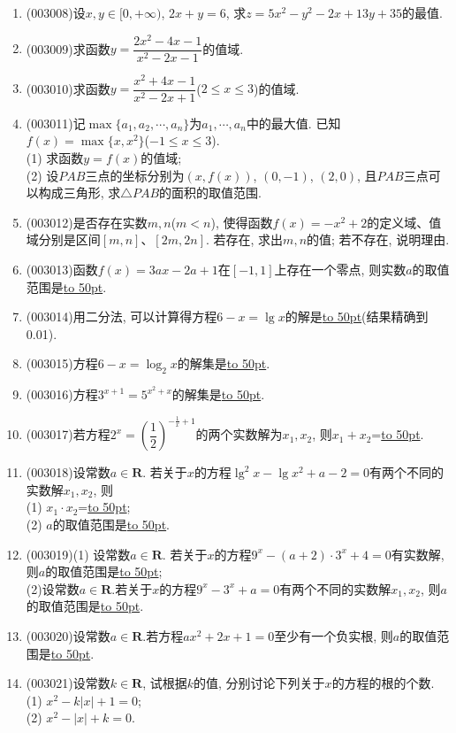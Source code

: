 \documentclass[10pt,a4paper]{article}
\newcommand{\blank}[1]{\underline{\hbox to #1pt{}}}
\begin{document}
\begin{enumerate}[1.]
\item {\tiny (003008)}设$x,y\in [0,+\infty)$, $2x+y=6$, 求$z=5x^2-y^2-2x+13y+35$的最值.
\item {\tiny (003009)}求函数$y=\dfrac{2x^2-4x-1}{x^2-2x-1}$的值域.
\item {\tiny (003010)}求函数$y=\dfrac{x^2+4x-1}{x^2-2x+1}$($2\le x\le 3$)的值域.
\item {\tiny (003011)}记$\max\{a_1,a_2,\cdots,a_n\}$为$a_1,\cdots,a_n$中的最大值. 已知$f(x)=\max\{x,x^2\}$($-1\le x\le 3$).\\
(1) 求函数$y=f(x)$的值域;\\
(2) 设$PAB$三点的坐标分别为$(x,f(x))$, $(0,-1)$, $(2,0)$, 且$PAB$三点可以构成三角形, 求$\triangle PAB$的面积的取值范围.
\item {\tiny (003012)}是否存在实数$m,n$($m<n$), 使得函数$f(x)=-x^2+2$的定义域、值域分别是区间$[m,n]$、$[2m,2n]$. 若存在, 求出$m,n$的值; 若不存在, 说明理由.
\item {\tiny (003013)}函数$f(x)=3ax-2a+1$在$[-1,1]$上存在一个零点, 则实数$a$的取值范围是\blank{50}.
\item {\tiny (003014)}用二分法, 可以计算得方程$6-x=\lg x$的解是\blank{50}(结果精确到0.01).
\item {\tiny (003015)}方程$6-x=\log_2 x$的解集是\blank{50}.
\item {\tiny (003016)}方程$3^{x+1}=5^{x^2+x}$的解集是\blank{50}.
\item {\tiny (003017)}若方程$2^x=(\dfrac 12)^{-\frac 1x+1}$的两个实数解为$x_1, x_2$, 则$x_1+x_2$=\blank{50}.
\item {\tiny (003018)}设常数$a\in \mathbf{R}$. 若关于$x$的方程$\lg^2x-\lg x^2+a-2=0$有两个不同的实数解$x_1, x_2$, 则\\
(1) $x_1\cdot x_2$=\blank{50};\\
(2) $a$的取值范围是\blank{50}.
\item {\tiny (003019)}(1) 设常数$a\in \mathbf{R}$. 若关于$x$的方程$9^x-(a+2)\cdot 3^x+4=0$有实数解, 则$a$的取值范围是\blank{50};\\
(2)设常数$a\in \mathbf{R}$.若关于$x$的方程$9^x-3^x+a=0$有两个不同的实数解$x_1, x_2$, 则$a$的取值范围是\blank{50}.
\item {\tiny (003020)}设常数$a\in \mathbf{R}$.若方程$ax^2+2x+1=0$至少有一个负实根, 则$a$的取值范围是\blank{50}.
\item {\tiny (003021)}设常数$k\in \mathbf{R}$, 试根据$k$的值, 分别讨论下列关于$x$的方程的根的个数.\\
(1) $x^2-k|x|+1=0$;\\
(2) $x^2-|x|+k=0$.

\end{enumerate}
\end{document}
